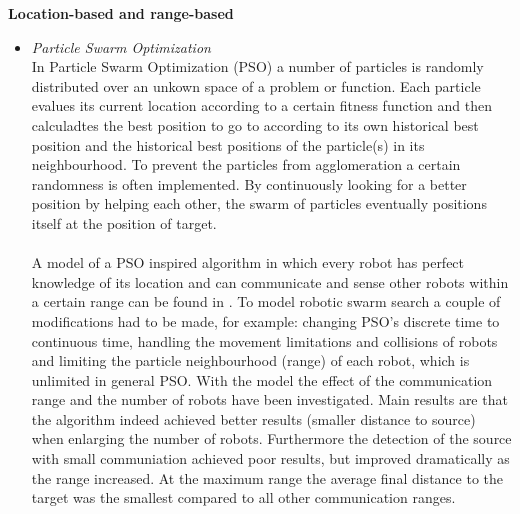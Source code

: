 	\textbf{Location-based and range-based}
	\begin{itemize}
		\item 
		\textit{Particle Swarm Optimization}\\
		In Particle Swarm Optimization (PSO) a number of particles is randomly distributed over an unkown space of a problem or function. 
		Each particle evalues its current location according to a certain fitness function and then calculadtes the best position to go to according to its own historical best position and the historical best positions of the particle(s) in its neighbourhood.
		To prevent the particles from agglomeration a certain randomness is often implemented. 
		By continuously looking for a better position by helping each other, the swarm of particles eventually positions itself at the position of target. \cite{poli2007particle}\\
		\\
		A model of a PSO inspired algorithm in which every robot has perfect knowledge of its location and can communicate and sense other robots within a certain range can be found in \cite{pugh2007inspiring}.
		To model robotic swarm search a couple of modifications had to be made, for example: changing PSO's discrete time to continuous time, handling the movement limitations and collisions of robots and limiting the particle neighbourhood (range) of each robot, which is unlimited in general PSO.
		With the model the effect of the communication range and the number of robots have been investigated.
		Main results are that the algorithm indeed achieved better results (smaller distance to source) when enlarging the number of robots.
		Furthermore the detection of the source with small communiation achieved poor results, but improved dramatically as the range increased.
		At the maximum range the average final distance to the target was the smallest compared to all other communication ranges.


\end{itemize}
